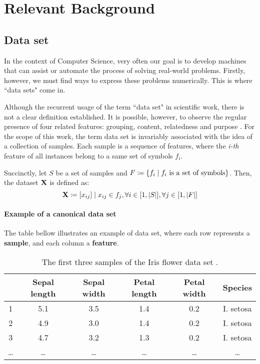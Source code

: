 \chapter{Relevant Background}
\section{Data set}

In the context of Computer Science, very often our goal is to develop machines that can assist or automate the process of solving real-world problems. Firstly, however, we must find ways to express these problems numerically. This is where ``data sets" come in.

Although the recurrent usage of the term ``data set" in scientific work, there is not a clear definition established. It is possible, however, to observe the regular presence of four related features: grouping, content, relatedness and purpose \cite{ren2010}.
For the scope of this work, the term data set is invariably associated with the idea of a collection of samples. Each sample is a sequence of features, where the {\em i-th} feature of all instances belong to a same set of symbols $f_i$.

Succinctly, let $S$ be a set of samples and $F \coloneqq  \{f_i \mid f_i \textnormal{ is a set of symbols}\}$.
Then, the dataset $\mathbf{X}$ is defined as:
$$\mathbf{X} \coloneqq [x_{ij}] \mid x_{ij} \in f_j, \forall i \in [1, |S|], \forall j \in [1, |F|]$$

\subsubsection{Example of a canonical data set} \label{irisdataset}

The table bellow illustrates an example of data set, where each row represents a \textbf{sample}, and each column a \textbf{feature}.

\begin{table}[H]
	\begin{tabular}{ c || *{5}{c|}}
		& \textbf{Sepal length} & \textbf{Sepal width} & \textbf{Petal length} & \textbf{Petal width} & \textbf{Species} \\
		\hline
		1 & 5.1	& 3.5 & 1.4 & 0.2 & I. setosa \\
		2 & 4.9 & 3.0 & 1.4 & 0.2 & I. setosa \\
		3 & 4.7 & 3.2 & 1.3 & 0.2 & I. setosa \\
		… & … & … & … & … & … \\
	\end{tabular}
	\caption{The first three samples of the Iris flower data set \protect\footnotemark.}
\end{table}

